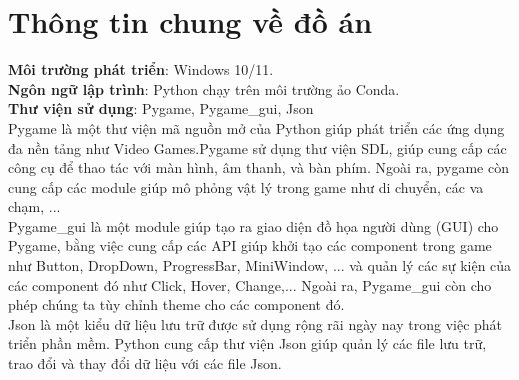 \section{Thông tin chung về đồ án}
\textbf{Môi trường phát triển}: Windows 10/11.\\
\textbf{Ngôn ngữ lập trình}: Python chạy trên môi trường ảo Conda.\\
\textbf{Thư viện sử dụng}: Pygame, Pygame\_gui, Json\\
Pygame là một thư viện mã nguồn mở của Python giúp phát triển các ứng dụng đa nền tảng như Video Games.Pygame sử dụng thư viện SDL, giúp cung cấp các công cụ để thao tác với màn hình, âm thanh, và bàn phím. Ngoài ra, pygame còn cung cấp các module giúp mô phỏng vật lý trong game như di chuyển, các va chạm, ...\\
Pygame\_gui là một module giúp tạo ra giao diện đồ họa người dùng (GUI) cho Pygame, bằng việc cung cấp các API giúp khởi tạo các component trong game như Button, DropDown, ProgressBar, MiniWindow, ... và quản lý các sự kiện của các component đó như Click, Hover, Change,... Ngoài ra, Pygame\_gui còn cho phép chúng ta tùy chỉnh theme cho các component đó.\\
Json là một kiểu dữ liệu lưu trữ được sử dụng rộng rãi ngày nay trong việc phát triển phần mềm. Python cung cấp thư viện Json giúp quản lý các file lưu trữ, trao đổi và thay đổi dữ liệu với các file Json.\\
